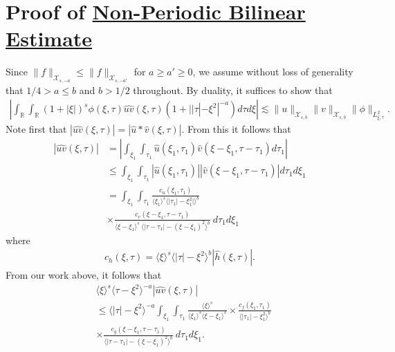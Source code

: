 \documentclass[12pt,reqno]{amsart}
\numberwithin{equation}{section}  %
\newcommand{\rr}{\mathbb{R}}
\newcommand{\wh}{\widehat}
\begin{document}
\section{Proof of \hyperref[prop:bilin-est-real]{Non-Periodic Bilinear Estimate}} 
%
\label{sec:bilin-est-real}
Since $\| f \|_{\mathcal{X}_{s,-a}} \le \| f \|_{\mathcal{X}_{s, -a'}}$ for $a \ge a' \ge 0$, we assume
without loss of generality that $1/4 > a \le b$ and $b > 1/2$ throughout. 
By duality, it suffices to show that 
%
\begin{equation}
	\label{duality-est-real}
	\begin{split}
    |	\int_{\rr} \int_{\rr} (1 + |\xi|)^{s}
		\phi(\xi, \tau) \wh{uv}(\xi, \tau)(1 
    + | |\tau| - \xi^{2} |^{-a}) d \tau d \xi | \lesssim \|u\|_{\mathcal{X}_{s,b}}
    \|v\|_{\mathcal{X}_{s,b}}
    \|\phi \|_{L^{2}_{\xi, \tau}}.
	\end{split}
\end{equation}
Note first that $|\wh{uv}(\xi, \tau) |  = | \wh{u} *  \wh{v} 
(\xi, \tau)|$. From this it follows that
%
%
\begin{equation}
	\label{non-lin-rep-real}
	\begin{split}
		| \wh{uv}(\xi, \tau)|
    & = | \int_{\xi_{1}}  \int_{\tau_{1}}
    \wh{u}\left( \xi_1,  \tau_1 \right) \wh{v}\left( \xi - \xi_1 , \tau - \tau_1   
\right) d \tau_1 |
\\
& \le  \int_{\xi_{1}}  \int_{\tau_{1}}
    |\wh{u}\left( \xi_1,  \tau_1 \right)| |\wh{v}\left( \xi - \xi_1 , \tau - \tau_1   
    \right)| d \tau_1 d \xi_{1}
\\
& = \int_{\xi_1} \int_{\tau_{1}} \frac{c_u\left( \xi_1, \tau_1 
\right)}{\langle \xi_1 \rangle ^s \langle |\tau_1| - \xi_1^{2} | \rangle ^{b}}
\\
& \times \frac{c_{v}\left( \xi - \xi_1, \tau - \tau_1 \right)}{\langle \xi -
\xi_1 \rangle ^s\ \langle |\tau - \tau_1 | -  (\xi - \xi_1)^{2} \rangle^{b}}
\ d \tau_1 d \xi_{1}
\end{split}
\end{equation}
%
%
where 
\begin{equation*}
	\begin{split}
		c_h(\xi, \tau) =
			\langle \xi \rangle ^s \langle |\tau| - \xi^{2} \rangle ^{b} | \wh{h}\left( \xi, \tau \right) |.
	\end{split}
\end{equation*}
%
%
From our work above, it follows that 
%
%
\begin{equation}
	\label{convo-est-starting-pnt-real}
	\begin{split}
		 & \langle \xi \rangle^s \langle \tau - \xi^{2} \rangle^{-a} | \wh{uv}\left( 
		\xi, \tau \right) |
		\\
		& \le \langle |\tau| - \xi^{2} \rangle^{-a}
    \int_{\xi_1} \int_{\tau_{1}} \frac{\langle \xi \rangle^{s}}{\langle \xi_1 \rangle^s
    \langle \xi - \xi_1 \rangle^s} 
		\times \frac{c_f(\xi_1, \tau_1)}{\langle |\tau_1| - \xi_1^{2} \rangle ^{b}}
		\\
		& \times
		\frac{c_g(\xi - \xi_1, \tau - \tau_1 )}{\langle |\tau - \tau_1| - (\xi - \xi_1)^{2}
    \rangle^{b}}\ d \tau_1 d \xi_{1}.
	\end{split}
\end{equation}
\end{document}
